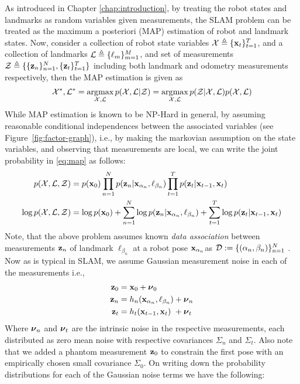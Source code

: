As introduced in Chapter \ref{chap:introduction}, by treating the robot states and landmarks as random variables given measurements, the SLAM problem can be treated as the maximum a posteriori (MAP) estimation of robot and landmark states. Now, consider a collection of robot state variables $\mathcal{X} \triangleq \{ \mathbf{x}_t \}_{t=1}^{T}$, and a collection of landmarks $\mathcal{L} \triangleq \{ \ell_m \}_{m=1}^{M}$, and set of measurements $\mathcal{Z} \triangleq \{\{\mathbf{z}_n \}_{n=1}^{N}, \{\mathbf{z}_t\}_{t=1}^{T}\}$ including both landmark and odometry measurements respectively, then the MAP estimation is given as
\begin{align}
    \mathcal{X}^*, \mathcal{L}^* = \operatorname*{\arg\!\max}_{\mathcal{X}, \mathcal{L}} p(\mathcal{X}, \mathcal{L} | \mathcal{Z}) = \operatorname*{\arg\!\max}_{\mathcal{X}, \mathcal{L}} p(\mathcal{Z} | \mathcal{X}, \mathcal{L}) p(\mathcal{X}, \mathcal{L}) \label{eq:map}
\end{align}
While MAP estimation is known to be NP-Hard in general, by assuming reasonable conditional independences between the associated variables (see Figure~\ref{fig:factor-graph}), i.e., by making the markovian assumption on the state variables, and observing that measurements are local, we can write the joint probability in \ref{eq:map} as follows:
\begin{align}
    p(\mathcal{X}, \mathcal{L}, \mathcal{Z}) &= p(\mathbf{x}_0) \prod_{n=1}^{N} p(\mathbf{z}_n | \mathbf{x}_{\alpha_n}, \ell_{\beta_n}) \prod_{t=1}^{T} p(\mathbf{z}_t | \mathbf{x}_{t-1}, \mathbf{x}_{t})\nonumber\\
    \log p(\mathcal{X}, \mathcal{L}, \mathcal{Z}) &= \log p(\mathbf{x}_0) + \sum_{n=1}^{N} \log p(\mathbf{z}_n | \mathbf{x}_{\alpha_n}, \ell_{\beta_n}) + \sum_{t=1}^{T} \log p(\mathbf{z}_t | \mathbf{x}_{t-1}, \mathbf{x}_{t})
\end{align}
Note, that the above problem assumes known \emph{data association} between measurements $\mathbf{z}_n$ of landmark $\ell_{\beta_n}$ at a robot pose $\mathbf{x}_{\alpha_n}$as $\mathcal{D} := \{(\alpha_n, \beta_n)\}_{n=1}^{N}$ \cite{bowmanProbabilisticDataAssociation2017}.
Now as is typical in SLAM, we assume Gaussian measurement noise in each of the measurements i.e.,
\begin{align}
    \mathbf{z}_0 &= \mathbf{x}_0 + \boldsymbol \nu_0\\
    \mathbf{z}_n &= h_n(\mathbf{x}_{\alpha_n}, \ell_{\beta_n}) + \boldsymbol \nu_n\\
    \mathbf{z}_t &= h_t(\mathbf{x}_{t-1}, \mathbf{x}_t) ~+ \boldsymbol \nu_t
\end{align}
Where $\boldsymbol \nu_n$ and $\boldsymbol \nu_t$ are the intrinsic noise in the respective measurements, each distributed as zero mean noise with respective covariances $\Sigma_n$ and $\Sigma_t$. Also note that we added a phantom measurement $\mathbf{z}_0$ to constrain the first pose with an empirically chosen small covariance $\Sigma_0$. On writing down the probability distributions for each of the Gaussian noise terms we have the following:
